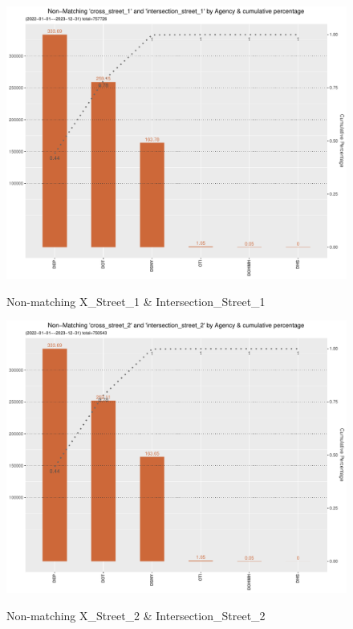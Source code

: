 \documentclass[12pt, titlepage]{article}
\begin{document}
{	\begin{figure}[tbp]
		 \centering
		 \caption{Non-matching X\_Street\_1 \& Intersection\_Street\_1}
		 \includegraphics[width = \textwidth]{non-matchingcross_street_1andintersection_street_1.pdf}
		 \label{fig:xstreet1}
	\end{figure}	

	\begin{figure}[tbp]
		 \centering
		 \caption{Non-matching X\_Street\_2 \& Intersection\_Street\_2}
		 \includegraphics[width = \textwidth]{non-matchingcross_street_2andintersection_street_2.pdf}
		 \label{fig:xstreet2}
	\end{figure}	

}
\end{document}
